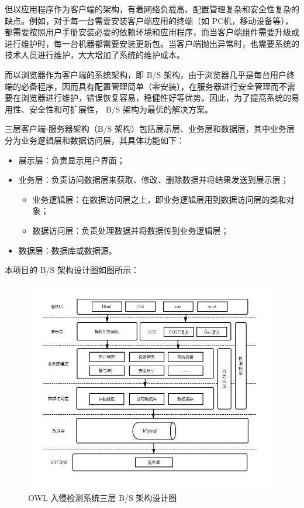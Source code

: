 \documentclass[article]{BJTU-thesis}
\begin{document}
但以应用程序作为客户端的架构，有着网络负载高、配置管理复杂和安全性复杂的缺点。例如，对于每一台需要安装客户端应用的终端（如 PC机，移动设备等），都需要按照用户手册安装必要的依赖环境和应用程序，而当客户端组件需要升级或进行维护时，每一台机器都需要安装更新包。当客户端抛出异常时，也需要系统的技术人员进行维护，大大增加了系统的维护成本。

而以浏览器作为客户端的系统架构，即 B/S 架构，由于浏览器几乎是每台用户终端的必备程序，因而具有配置管理简单（零安装），在服务器进行安全管理而不需要在浏览器进行维护，错误恢复容易，稳健性好等优势。因此，为了提高系统的易用性、安全性和可扩展性， B/S 架构为最优的解决方案。

三层客户端-服务器架构（B/S 架构）包括展示层、业务层和数据层，其中业务层分为业务逻辑层和数据访问层，其具体功能如下：
\begin{itemize}
\item 展示层：负责显示用户界面；
\item  业务层：负责访问数据层来获取、修改、删除数据并将结果发送到展示层；
\begin{itemize}
\item  业务逻辑层：在数据访问层之上，即业务逻辑层用到数据访问层的类和对象；
\item  数据访问层：负责处理数据并将数据传到业务逻辑层；
\end{itemize}
\item  数据层：数据库或数据源。
\end{itemize}

本项目的 B/S 架构设计图如图所示：

\begin{figure}[!htbp]
	\centering
	\includegraphics[scale=.8]{img/t1.jpg}
		\caption{OWL 入侵检测系统三层 B/S 架构设计图}
\end{figure}
\end{document}
